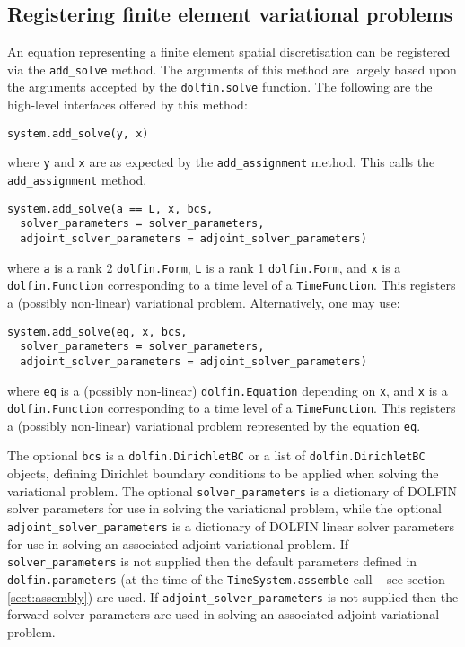 \documentclass[a4paper]{book}
\begin{document}
\subsection{Registering finite element variational problems}

An equation representing a finite element spatial discretisation can be
registered via the \verb+add_solve+ method. The arguments of this method are
largely based upon the arguments accepted by the \verb+dolfin.solve+ function.
The following are the high-level interfaces offered by this method:

\begin{lstlisting}
system.add_solve(y, x)
\end{lstlisting}
where \verb+y+ and \verb+x+ are as expected by the \verb+add_assignment+ method.
This calls the \verb+add_assignment+ method.

\begin{lstlisting}
system.add_solve(a == L, x, bcs,
  solver_parameters = solver_parameters,
  adjoint_solver_parameters = adjoint_solver_parameters)
\end{lstlisting}
where \verb+a+ is a rank 2 \verb+dolfin.Form+, \verb+L+ is a rank 1 \linebreak
\verb+dolfin.Form+, and \verb+x+ is a \verb+dolfin.Function+ corresponding to a
time level of a \linebreak \verb+TimeFunction+. This registers a (possibly
non-linear) variational problem. Alternatively, one may use:
\begin{lstlisting}
system.add_solve(eq, x, bcs,
  solver_parameters = solver_parameters,
  adjoint_solver_parameters = adjoint_solver_parameters)
\end{lstlisting}
where \verb+eq+ is a (possibly non-linear) \verb+dolfin.Equation+ depending on
\verb+x+, and \verb+x+ is a \verb+dolfin.Function+ corresponding to a time level
of a \verb+TimeFunction+. This registers a (possibly non-linear) variational
problem represented by the equation \verb+eq+.

The optional \verb+bcs+ is a \verb+dolfin.DirichletBC+ or a list of
\verb+dolfin.DirichletBC+ objects, defining Dirichlet boundary conditions to be
applied when solving the variational problem. The optional
\verb+solver_parameters+ is a dictionary of DOLFIN solver parameters for use in
solving the variational problem, while the optional
\verb+adjoint_solver_parameters+ is a dictionary of DOLFIN linear solver
parameters for use in solving an associated adjoint variational problem. If
\verb+solver_parameters+ is not supplied then the default parameters defined in
\verb+dolfin.parameters+ (at the time of the \verb+TimeSystem.assemble+ call --
see section \ref{sect:assembly}) are used. If \verb+adjoint_solver_parameters+
is not supplied then the forward solver parameters are used in solving an
associated adjoint variational problem.
\end{document}
